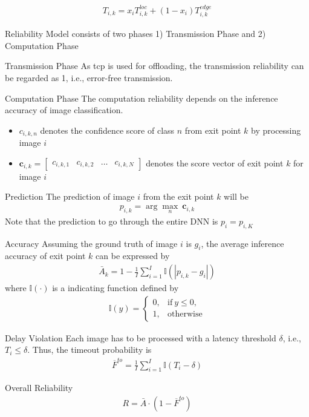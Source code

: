 \begin{enumdescript}
\begin{enumdescript}
			\begin{align}
			T_{i,k}=x_i T_{i,k}^{loc} +(1-x_i)T_{i,k}^{edge}
			\end{align}
		\end{enumdescript}
		\item[Reliability Model] consists of two phases 1) Transmission Phase and 2) Computation Phase 
		\begin{enumdescript}
			\item[Transmission Phase] As \gls{tcp} is used for offloading, the transmission reliability can be
			regarded as 1, i.e., error-free transmission.
			\item[Computation Phase]  The computation reliability depends on the inference accuracy of
			image classification.
			\begin{itemize}
				\item $ c_{i,k,n} $ denotes the confidence score of class $ n $ from exit point $ k $ by processing image $ i $
				\item $ \mathbf{c}_{i,k} = \left[\begin{array}{cccc}c_{i,k,1} & c_{i,k,2} & \dots & c_{i,k,N}\end{array}\right] $ denotes the score vector of exit point $ k $ for image $ i $
			\end{itemize}
			\begin{enumdescript}
				\item[Prediction] The prediction of image $ i $ from the exit point $ k $ will be
				\begin{align}
				p_{i,k} = \arg \underset{n}{\max}\: \mathbf{c}_{i,k}
				\end{align}
				Note that the prediction to go through the entire DNN is $ p_i  = p_{i,K} $
				\item[Accuracy] Assuming the ground truth of image $ i $ is $ g_i $, the average inference accuracy of exit point $ k $ can be expressed by
				\begin{align}
				\bar{A}_{k}=1-\frac{1}{I} \sum_{i=1}^{I} \mathbb{I}\left(\left|p_{i,k}-g_{i}\right|\right)
				\end{align}
				where $ \mathbb{I(\cdot)}  $ is a indicating function defined by
				\begin{align}
				\mathbb{I}(y)= \begin{cases}
				0, & \mathrm{if\:} y \leq 0, \\
				1, & \mathrm{otherwise}
				\end{cases}
				\end{align}
			\end{enumdescript}
			\item[Delay Violation] Each image has to be processed with a latency threshold $ \delta $, i.e., $ T_{i} \leq \delta $. Thus, the timeout probability is
			\begin{align}
			\overline{F}^{to}=\frac{1}{I}\sum_{i=1}^{I} \mathbb{I}\left(T_{i}-\delta\right)
			\end{align}
			\item[Overall Reliability]\begin{align}
			R= \bar{A} \cdot (1-\overline{F}^{to})
			\end{align}
			

\end{enumdescript}
\end{enumdescript}

